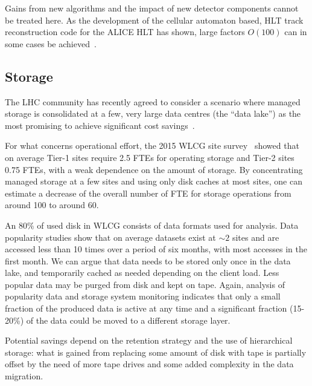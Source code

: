 Gains from new algorithms and the impact of new detector components
cannot be treated here. As the development of the cellular automaton
based, HLT track reconstruction code for the ALICE HLT has shown,
large factors $O(100)$ can in some cases be achieved~\cite{rohr}.

\subsection{Storage}
The LHC community has recently agreed to consider a scenario where
managed storage is consolidated at a few, very large data centres (the
``data lake'') as the most promising to achieve significant cost
savings~\cite{cwp}.

For what concerns operational effort, the 2015 WLCG site
survey~\cite{survey} showed that on average Tier-1 sites require 2.5
FTEs for operating storage and Tier-2 sites 0.75 FTEs, with a weak
dependence on the amount of storage. By concentrating managed storage
at a few sites and using only disk caches at
most sites, one can estimate a decrease of the overall number of FTE
for storage operations from around 100 to around 60.

An $80\%$ of used disk in WLCG consists of data formats used for
analysis. Data popularity studies show that on average datasets exist
at $\sim2$ sites and are accessed less than 10 times over a period of
six months, with most accesses in the first month.  We can argue that
data needs to be stored only once in the data lake, and temporarily
cached as needed depending on the client load. Less popular data may
be purged from disk and kept on tape.
Again, analysis of popularity data and storage system monitoring
indicates that only a small fraction of the produced data is active at
any time and a significant fraction (15-20\%) of the data could be
moved to a different storage layer.

Potential savings depend on the retention strategy and the use of
hierarchical storage: what is gained from replacing some amount of
disk with tape is partially offset by the need of more tape drives and
some added complexity in the data migration.

